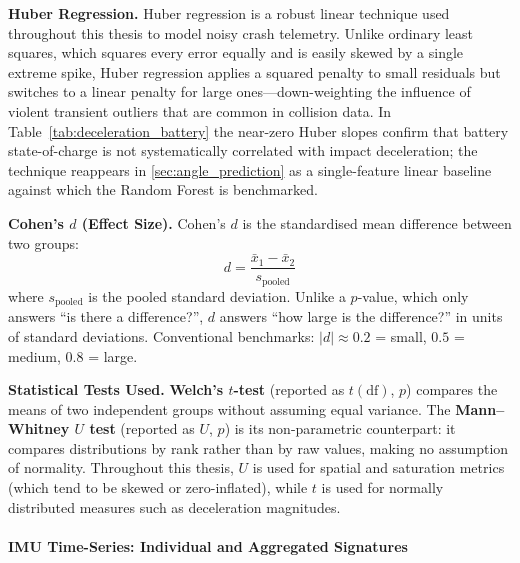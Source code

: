\begin{tcolorbox}[breakable, colback=gray!8, colframe=black!30, arc=0pt,
    boxsep=10pt, left=4pt, right=4pt, top=4pt, bottom=4pt,
    before skip=6pt, after skip=6pt]
\textbf{Huber Regression.}
Huber regression is a robust linear technique used throughout this thesis to model noisy crash telemetry. Unlike ordinary least squares, which squares every error equally and is easily skewed by a single extreme spike, Huber regression applies a squared penalty to small residuals but switches to a linear penalty for large ones---down-weighting the influence of violent transient outliers that are common in collision data. In Table~\ref{tab:deceleration_battery} the near-zero Huber slopes confirm that battery state-of-charge is not systematically correlated with impact deceleration; the technique reappears in \autoref{sec:angle_prediction} as a single-feature linear baseline against which the Random Forest is benchmarked.
\end{tcolorbox}


\begin{tcolorbox}[breakable, colback=gray!8, colframe=black!30, arc=0pt,
    boxsep=10pt, left=4pt, right=4pt, top=4pt, bottom=4pt,
    before skip=6pt, after skip=6pt]
\textbf{Cohen's $d$ (Effect Size).}
Cohen's $d$ is the standardised mean difference between two groups:
\begin{equation}
    d = \frac{\bar{x}_1 - \bar{x}_2}{s_{\text{pooled}}}
\end{equation}
where $s_{\text{pooled}}$ is the pooled standard deviation. Unlike a $p$-value, which only answers ``is there a difference?'', $d$ answers ``how large is the difference?'' in units of standard deviations. Conventional benchmarks: $|d| \approx 0.2$ = small, $0.5$ = medium, $0.8$ = large.

\textbf{Statistical Tests Used.}
\textbf{Welch's $t$-test} (reported as $t(\text{df})$, $p$) compares the means of two independent groups without assuming equal variance. The \textbf{Mann--Whitney $U$ test} (reported as $U$, $p$) is its non-parametric counterpart: it compares distributions by rank rather than by raw values, making no assumption of normality. Throughout this thesis, $U$ is used for spatial and saturation metrics (which tend to be skewed or zero-inflated), while $t$ is used for normally distributed measures such as deceleration magnitudes.
\end{tcolorbox}

\paragraph{IMU Time-Series: Individual and Aggregated Signatures}


